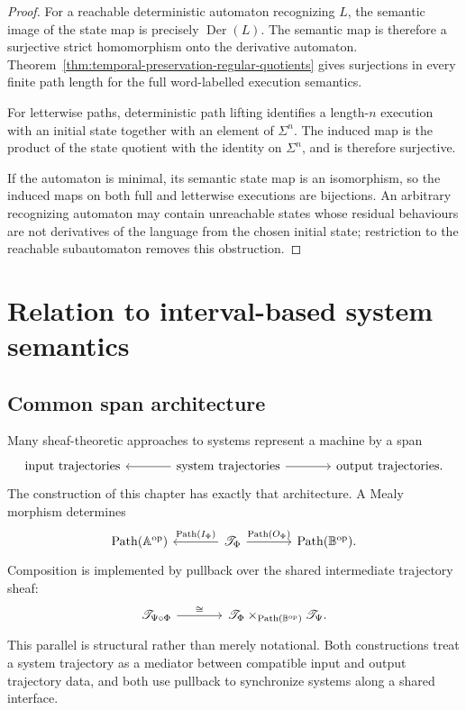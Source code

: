 \begin{proof}
For a reachable deterministic automaton recognizing \(L\), the semantic image
of the state map is precisely \(\operatorname{Der}(L)\). The semantic map is
therefore a surjective strict homomorphism onto the derivative automaton.
Theorem~\ref{thm:temporal-preservation-regular-quotients} gives surjections in
every finite path length for the full word-labelled execution semantics.

For letterwise paths, deterministic path lifting identifies a length-\(n\)
execution with an initial state together with an element of \(\Sigma^n\). The
induced map is the product of the state quotient with the identity on
\(\Sigma^n\), and is therefore surjective.

If the automaton is minimal, its semantic state map is an isomorphism, so the
induced maps on both full and letterwise executions are bijections. An
arbitrary recognizing automaton may contain unreachable states whose residual
behaviours are not derivatives of the language from the chosen initial state;
restriction to the reachable subautomaton removes this obstruction.
\end{proof}

\section{Relation to interval-based system semantics}
\label{sec:comparison-interval-sheaf-machines}

\subsection{Common span architecture}
\label{subsec:common-span-architecture-temporal}

Many sheaf-theoretic approaches to systems represent a machine by a span
\[
\begin{tikzcd}[column sep=large]
    \text{input trajectories}
    &
    \text{system trajectories}
        \arrow[l]
        \arrow[r]
    &
    \text{output trajectories}.
\end{tikzcd}
\]
The construction of this chapter has exactly that architecture. A Mealy
morphism determines
\[
\begin{tikzcd}[column sep=large]
    \operatorname{Path}(\mathbb A^{\mathrm{op}})
    &
    \mathscr T_\Phi
        \arrow[l, "{\operatorname{Path}(I_\Phi)}"']
        \arrow[r, "{\operatorname{Path}(O_\Phi)}"]
    &
    \operatorname{Path}(\mathbb B^{\mathrm{op}}).
\end{tikzcd}
\]
Composition is implemented by pullback over the shared intermediate
trajectory sheaf:
\[
\begin{tikzcd}[column sep=large]
    \mathscr T_{\Psi\circ\Phi}
        \arrow[r, "\cong"]
    &
    \mathscr T_\Phi
        \times_{\operatorname{Path}(\mathbb B^{\mathrm{op}})}
    \mathscr T_\Psi.
\end{tikzcd}
\]
This parallel is structural rather than merely notational. Both constructions
treat a system trajectory as a mediator between compatible input and output
trajectory data, and both use pullback to synchronize systems along a shared
interface.

